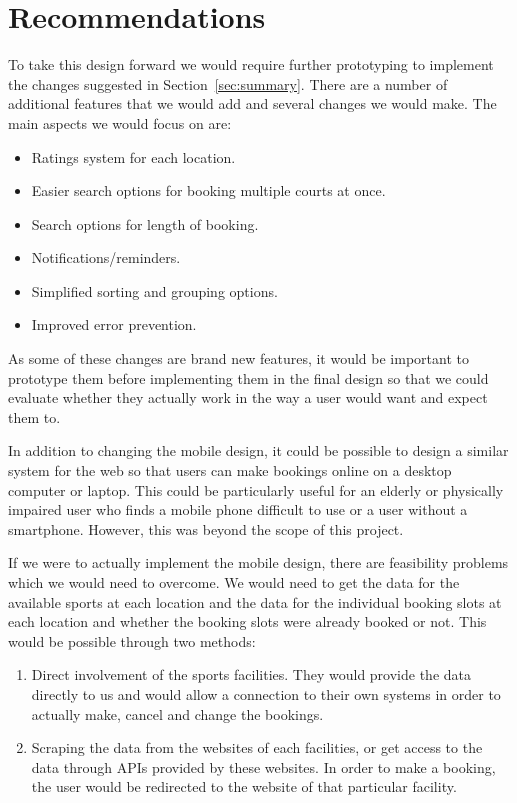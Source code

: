 \section{Recommendations}
\label{sec:recommendations}

To take this design forward we would require further prototyping to implement
the changes suggested in Section~\ref{sec:summary}.  There are a number of
additional features that we would add and several changes we would make. The
main aspects we would focus on are:

\begin{itemize}
	\item Ratings system for each location.
	\item Easier search options for booking multiple courts at once.
	\item Search options for length of booking.
	\item Notifications/reminders.
	\item Simplified sorting and grouping options.
	\item Improved error prevention.
\end{itemize}

As some of these changes are brand new features, it would be important to
prototype them before implementing them in the final design so that we could
evaluate whether they actually work in the way a user would want and expect
them to.

In addition to changing the mobile design, it could be possible to design a
similar system for the web so that users can make bookings online on a desktop
computer or laptop. This could be particularly useful for an elderly or
physically impaired user who finds a mobile phone difficult to use or a user
without a smartphone. However, this was beyond the scope of this project.

If we were to actually implement the mobile design, there are feasibility
problems which we would need to overcome. We would need to get the data for the
available sports at each location and the data for the individual booking slots
at each location and whether the booking slots were already booked or not. This
would be possible through two methods:

\begin{enumerate}
	\item Direct involvement of the sports facilities. They would provide the
		data directly to us and would allow a connection to their own systems
		in order to actually make, cancel and change the bookings.

	\item Scraping the data from the websites of each facilities, or get access
		to the data through APIs provided by these websites. In order to make a
		booking, the user would be redirected to the website of that particular
		facility.
\end{enumerate}

